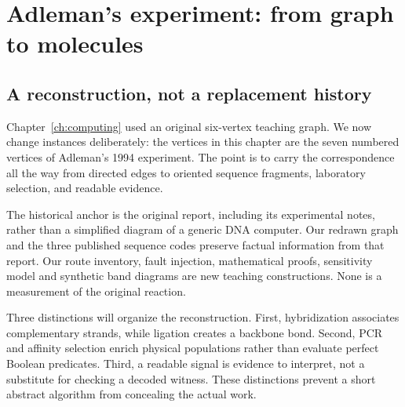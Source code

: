 \chapter{Adleman's experiment: from graph to molecules}\label{ch:adleman}

\section{A reconstruction, not a replacement history}
Chapter~\ref{ch:computing} used an original six-vertex teaching graph. We now change instances deliberately: the vertices in this chapter are the seven numbered vertices of Adleman's 1994 experiment. The point is to carry the correspondence all the way from directed edges to oriented sequence fragments, laboratory selection, and readable evidence.

The historical anchor is the original report, including its experimental notes, rather than a simplified diagram of a generic DNA computer.\cite{adleman} Our redrawn graph and the three published sequence codes preserve factual information from that report. Our route inventory, fault injection, mathematical proofs, sensitivity model and synthetic band diagrams are new teaching constructions. None is a measurement of the original reaction.

Three distinctions will organize the reconstruction. First, hybridization associates complementary strands, while ligation creates a backbone bond. Second, PCR and affinity selection enrich physical populations rather than evaluate perfect Boolean predicates. Third, a readable signal is evidence to interpret, not a substitute for checking a decoded witness. These distinctions prevent a short abstract algorithm from concealing the actual work.

